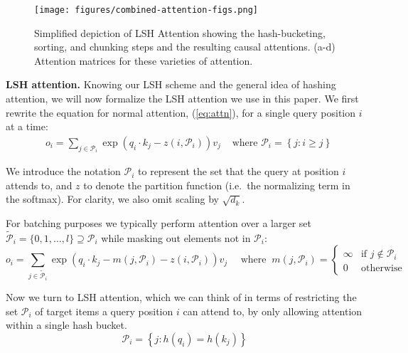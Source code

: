 \documentclass{article} \usepackage{iclr2020_conference,times}
\renewcommand{\paragraph}[1]{\textbf{#1}}
\def\pair{\mathcal{P}}
\def\extpair{\widetilde{\mathcal{P}}}
\begin{document}
\begin{figure}
        \centering
        \texttt{[image: figures/combined-attention-figs.png]}
        \caption{Simplified depiction of LSH Attention showing the hash-bucketing, sorting, 
                  and chunking steps and the resulting causal attentions. (a-d) Attention matrices for these varieties of attention.}
        \label{fig:attnpattern}
\end{figure}

\paragraph{LSH attention.}
Knowing our LSH scheme and the general idea of hashing attention, we will now formalize the LSH attention we use in this paper. We first rewrite the equation for normal attention, (\ref{eq:attn}), for a single query position $i$ at a time:
\begin{align}
    &o_i = \sum_{j \in \pair_i} \exp \left(q_i \cdot k_j - z(i, \pair_i) \right) v_j
    &\text{ where } \pair_i = \left\{j : i \geq j \right\}
\end{align}

We introduce the notation $\pair_i$ to represent the set that the query at position $i$ attends to, and $z$ to denote the partition function (i.e.\ the normalizing term in the softmax). For clarity, we also omit scaling by $\sqrt{d_k}$.

For batching purposes we typically perform attention over a larger set $\extpair_i = \{0, 1, \ldots, l\} \supseteq \pair_i$ while masking out elements not in $\pair_i$:
\begin{equation}\label{eq:attn-masked}
    o_i = \sum_{j \in \extpair_i} \exp \left(q_i \cdot k_j - m(j, \pair_i) - z(i, \pair_i) \right) v_j \quad
    \text{ where } \ m(j, \pair_i) = \begin{cases}
    \infty & \text{if } j \notin \pair_i\\
    0 & \text{otherwise}
    \end{cases}
\end{equation}

Now we turn to LSH attention, which we can think of in terms of restricting the set $\pair_i$ of target items a query position $i$ can attend to, by only allowing attention within a single hash bucket.
\begin{equation}
    \pair_i = \left\{ j : h(q_i) = h(k_j) \right\}
\end{equation}
\end{document}
